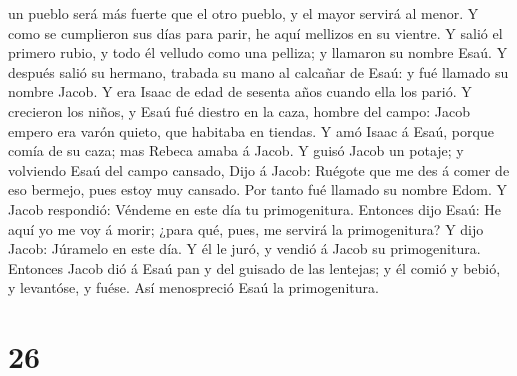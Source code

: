 un pueblo será más fuerte que el otro pueblo, y el mayor servirá al
menor.  Y como se cumplieron sus días para parir, he aquí
mellizos en su vientre.  Y salió el primero rubio, y todo
él velludo como una pelliza; y llamaron su nombre Esaú. 
Y después salió su hermano, trabada su mano al calcañar de Esaú: y fué
llamado su nombre Jacob. Y era Isaac de edad de sesenta años cuando ella
los parió.  Y crecieron los niños, y Esaú fué diestro en
la caza, hombre del campo: Jacob empero era varón quieto, que habitaba
en tiendas.  Y amó Isaac á Esaú, porque comía de su caza;
mas Rebeca amaba á Jacob.  Y guisó Jacob un potaje; y
volviendo Esaú del campo cansado,  Dijo á Jacob: Ruégote
que me des á comer de eso bermejo, pues estoy muy cansado. Por tanto fué
llamado su nombre Edom.  Y Jacob respondió: Véndeme en
este día tu primogenitura.  Entonces dijo Esaú: He aquí
yo me voy á morir; ¿para qué, pues, me servirá la primogenitura?
 Y dijo Jacob: Júramelo en este día. Y él le juró, y
vendió á Jacob su primogenitura.  Entonces Jacob dió á
Esaú pan y del guisado de las lentejas; y él comió y bebió, y levantóse,
y fuése. Así menospreció Esaú la primogenitura.

\hypertarget{section-25}{%
\section{26}\label{section-25}}


